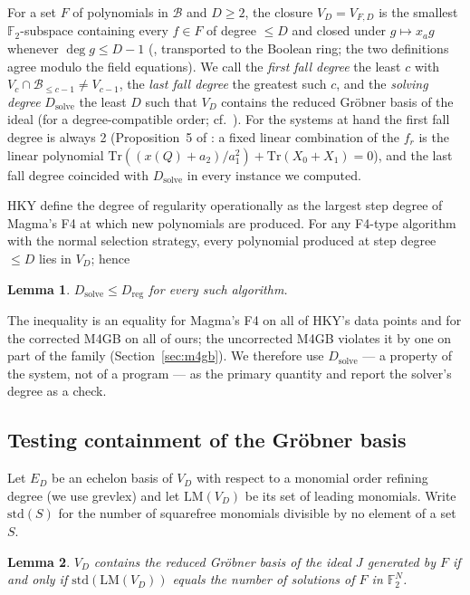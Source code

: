 \documentclass[11pt,a4paper]{article}
\newtheorem{lemma}{Lemma}
\theoremstyle{remark}\newtheorem{remark}{Remark}
\newcommand{\F}{\mathbb{F}}
\newcommand{\B}{\mathcal{B}}
\newcommand{\Dreg}{D_{\mathrm{reg}}}
\newcommand{\Dsolve}{D_{\mathrm{solve}}}
\newcommand{\lm}{\mathrm{LM}}
\newcommand{\std}{\mathrm{std}}
\newcommand{\Tr}{\mathrm{Tr}}
\begin{document}
For a set $F$ of polynomials in $\B$ and $D\ge2$, the closure $V_D=V_{F,D}$ is the smallest $\F_2$-subspace containing every $f\in F$ of degree $\le D$ and closed under $g\mapsto x_a g$ whenever $\deg g\le D-1$ (\cite[Definition~1]{HKY15}, transported to the Boolean ring; the two definitions agree modulo the field equations). We call the \emph{first fall degree} the least $c$ with $V_c\cap\B_{\le c-1}\ne V_{c-1}$, the \emph{last fall degree} the greatest such $c$, and the \emph{solving degree} $\Dsolve$ the least $D$ such that $V_D$ contains the reduced Gröbner basis of the ideal (for a degree-compatible order; cf.\ \cite{CG23,CCG23}). For the systems at hand the first fall degree is always 2 (Proposition~5 of \cite{HKY15}: a fixed linear combination of the $f_r$ is the linear polynomial $\Tr((x(Q)+a_2)/a_1^2)+\Tr(X_0+X_1)=0$), and the last fall degree coincided with $\Dsolve$ in every instance we computed.

HKY define the degree of regularity operationally as the largest step degree of Magma's F4 at which new polynomials are produced. For any F4-type algorithm with the normal selection strategy, every polynomial produced at step degree $\le D$ lies in $V_D$; hence

\begin{lemma}\label{lem:dsolve}
$\Dsolve\le\Dreg$ for every such algorithm.
\end{lemma}

The inequality is an equality for Magma's F4 on all of HKY's data points and for the corrected M4GB on all of ours; the uncorrected M4GB violates it by one on part of the family (Section~\ref{sec:m4gb}). We therefore use $\Dsolve$ --- a property of the system, not of a program --- as the primary quantity and report the solver's degree as a check.

\subsection{Testing containment of the Gröbner basis}

Let $E_D$ be an echelon basis of $V_D$ with respect to a monomial order refining degree (we use grevlex) and let $\lm(V_D)$ be its set of leading monomials. Write $\std(S)$ for the number of squarefree monomials divisible by no element of a set $S$.

\begin{lemma}\label{lem:std}
$V_D$ contains the reduced Gröbner basis of the ideal $J$ generated by $F$ if and only if $\std(\lm(V_D))$ equals the number of solutions of $F$ in $\F_2^N$.
\end{lemma}
\end{document}
